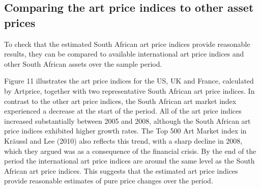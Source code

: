 \documentclass[12pt,]{article}
\begin{document}
\begin{table}[ht]
\centering
\caption{Smoothness Indicators} 
\end{table}

\subsection{Comparing the art price indices to other asset
prices}\label{comparing-the-art-price-indices-to-other-asset-prices}

To check that the estimated South African art price indices provide
reasonable results, they can be compared to available international art
price indices and other South African assets over the sample period.

Figure 11 illustrates the art price indices for the US, UK and France,
calculated by Artprice, together with two representative South African
art price indices. In contrast to the other art price indices, the South
African art market index experienced a decrease at the start of the
period. All of the art price indices increased substantially between
2005 and 2008, although the South African art price indices exhibited
higher growth rates. The Top 500 Art Market index in Kräussl and Lee
(2010) also reflects this trend, with a sharp decline in 2008, which
they argued was as a consequence of the financial crisis. By the end of
the period the international art price indices are around the same level
as the South African art price indices. This suggests that the estimated
art price indices provide reasonable estimates of pure price changes
over the period.
\end{document}
